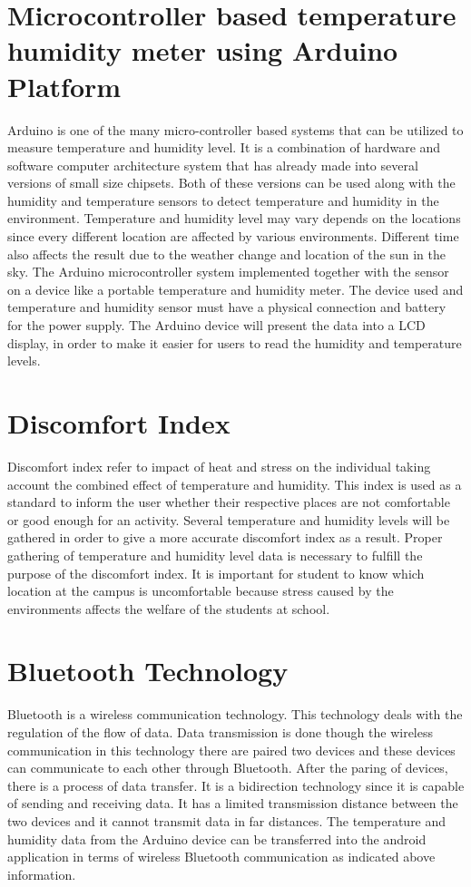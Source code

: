 
\section{Microcontroller based temperature humidity meter using Arduino Platform}
Arduino is one of the many micro-controller based systems that can be utilized to measure temperature and humidity level. It is a combination of hardware and software computer architecture system that has already made into several versions of small size chipsets. Both of these versions can be used along with the humidity and temperature sensors to detect temperature and humidity in the environment. Temperature and humidity level may vary depends on the locations since every different location are affected by various environments. Different time also affects the result due to the weather change and location of the sun in the sky. 
The Arduino microcontroller system implemented together with the sensor on a device like a portable temperature and humidity meter. The device used and temperature and humidity sensor must have a physical connection and battery for the power supply. The Arduino device will present the data into a LCD display, in order to make it easier for users to read the humidity and temperature levels.

\section{Discomfort Index}
Discomfort index refer to impact of heat and stress on the individual taking account the combined effect of temperature and humidity. This index is used as a standard to inform the user whether their respective places are not comfortable or good enough for an activity. Several temperature and humidity levels will be gathered in order to give a more accurate discomfort index as a result. Proper gathering of temperature and humidity level data is necessary to fulfill the purpose of the discomfort index. It is important for student to know which location at the campus is uncomfortable because stress caused by the environments affects the welfare of the students at school.  

\section{Bluetooth Technology}
Bluetooth is a wireless communication technology. This technology deals with the regulation of the flow of data. Data transmission is done though the wireless communication in this technology there are paired two devices and these devices can communicate to each other through Bluetooth. After the paring of devices, there is a process of data transfer. It is a bidirection technology since it is capable of sending and receiving data. It has a limited transmission distance between the two devices and it cannot transmit data in far distances. The temperature and humidity data from the Arduino device can be transferred into the android application in terms of wireless Bluetooth communication as indicated above information.

